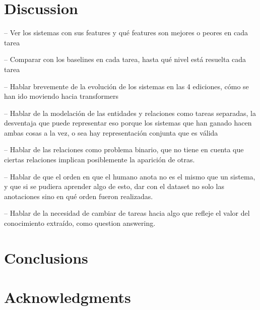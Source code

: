\documentclass[a4paper,11pt,twocolumn,twoside]{article}
\begin{document}
\section{Discussion}\label{sec:discussion}

-- Ver los sistemas con sus features y qué features son mejores o peores en cada tarea

-- Comparar con los baselines en cada tarea, hasta qué nivel está resuelta cada tarea

-- Hablar brevemente de la evolución de los sistemas en las 4 ediciones,
cómo se han ido moviendo hacia transformers

-- Hablar de la modelación de las entidades y relaciones como tareas separadas,
la desventaja que puede representar eso porque los sistemas que han ganado hacen
ambas cosas a la vez, o sea hay representación conjunta que es válida

-- Hablar de las relaciones como problema binario, que no tiene en cuenta que ciertas
relaciones implican posiblemente la aparición de otras.

-- Hablar de que el orden en que el humano anota no es el mismo que un sistema,
y que si se pudiera aprender algo de esto, dar con el dataset no solo las anotaciones
sino en qué orden fueron realizadas.

-- Hablar de la necesidad de cambiar de tareas hacia algo que refleje el valor
del conocimiento extraído, como question answering.

\section{Conclusions}\label{sec:conclusions}

\section*{Acknowledgments}



\end{document}
